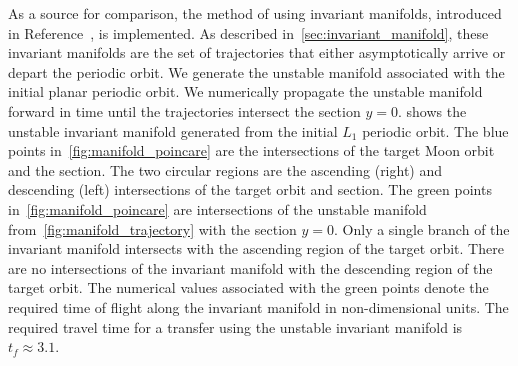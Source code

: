 \documentclass[preprint]{elsarticle}
\begin{document}
As a source for comparison, the method of using invariant manifolds, introduced in Reference~, is implemented.
As described in~\cref{sec:invariant_manifold}, these invariant manifolds are the set of trajectories that either asymptotically arrive or depart the periodic orbit. 
We generate the unstable manifold associated with the initial planar periodic orbit.
We numerically propagate the unstable manifold forward in time until the trajectories intersect the \Poincare section \( y = 0 \).
 shows the unstable invariant manifold generated from the initial \( L_1\) periodic orbit. 
The blue points in~\cref{fig:manifold_poincare} are the intersections of the target Moon orbit and the \Poincare section.
The two circular regions are the ascending (right) and descending (left) intersections of the target orbit and \Poincare section.
The green points in~\cref{fig:manifold_poincare} are intersections of the unstable manifold from~\cref{fig:manifold_trajectory} with the \Poincare section \( y = 0 \).
Only a single branch of the invariant manifold intersects with the ascending region of the target orbit.
There are no intersections of the invariant manifold with the descending region of the target orbit.
The numerical values associated with the green points denote the required time of flight along the invariant manifold in non-dimensional units.
The required travel time for a transfer using the unstable invariant manifold is \( t_f \approx 3.1\).
\end{document}
